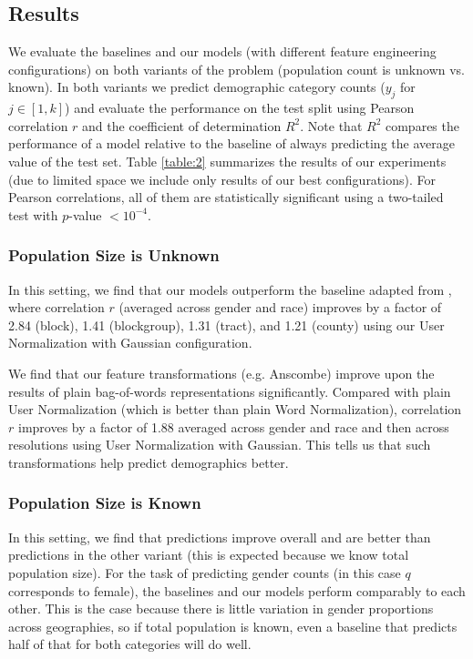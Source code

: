\documentclass[letterpaper]{article}
\begin{document}
\subsection{Results}
We evaluate the baselines and our models (with different feature engineering configurations) on both variants of the problem (population count is unknown vs. known). In both variants we predict demographic category counts ($y_j$ for $j \in[1,k]$) and evaluate the performance on the test split using Pearson correlation $r$ and the coefficient of determination $R^2$. Note that $R^2$ compares the performance of a model relative to the baseline of always predicting the average value of the test set. Table \ref{table:2} summarizes the results of our experiments (due to limited space we include only results of our best configurations). For Pearson correlations, all of them are statistically significant using a two-tailed test with $p$-value $< 10^{-4}$.

\subsubsection{Population Size is Unknown} In this setting, we find that our models outperform the baseline adapted from \cite{mohammady2014using}, where correlation $r$ (averaged across gender and race) improves by a factor of 2.84 (block), 1.41 (blockgroup), 1.31 (tract), and 1.21 (county) using our User Normalization with Gaussian configuration.

We find that our feature transformations (e.g. Anscombe) improve upon the results of plain bag-of-words representations significantly. Compared with plain User Normalization (which is better than plain Word Normalization), correlation $r$ improves by a factor of 1.88 averaged across gender and race and then across resolutions using User Normalization with Gaussian. This tells us that such transformations help predict demographics better.

\subsubsection{Population Size is Known} In this setting, we find that predictions improve overall and are better than predictions in the other variant (this is expected because we know total population size). For the task of predicting gender counts (in this case $q$ corresponds to female), the baselines and our models perform comparably to each other. This is the case because there is little variation in gender proportions across geographies, so if total population is known, even a baseline that predicts half of that for both categories will do well.
\end{document}
